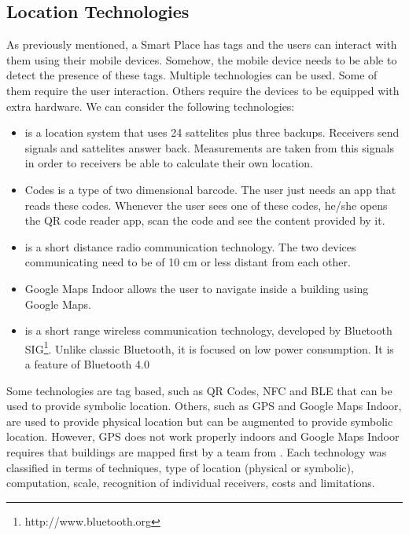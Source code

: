 \subsection{Location Technologies}
\label{sec:background_technologies}
As previously mentioned, a Smart Place has tags and the users can interact with them using their mobile devices.
Somehow, the mobile device needs to be able to detect the presence of these tags.
Multiple technologies can be used.
Some of them require the user interaction.
Others require the devices to be equipped with extra hardware.
We can consider the following technologies:
\begin{itemize}
  \item {}
  is a location system that uses 24 sattelites plus three backups.
  Receivers send signals and sattelites answer back. Measurements are taken from this signals in order to receivers be able to calculate their own location.
  \item {} Codes
  is a type of two dimensional barcode.
  The user just needs an app that reads these codes.
  Whenever the user sees one of these codes, he/she opens the \gls{QR} code reader app, scan the code and see the content provided by it.
  \item {}
  is a short distance radio communication technology.
  The two devices communicating need to be of 10 cm or less distant from each other.
  \item Google Maps Indoor
  allows the user to navigate inside a building using Google Maps.
  \item {}
  is a short range wireless communication technology, developed by Bluetooth \gls{SIG}\footnote{http://www.bluetooth.org}.
  Unlike classic Bluetooth, it is focused on low power consumption.
  It is a feature of Bluetooth 4.0\cite{bluetooth_specification}
\end{itemize}

Some technologies are tag based, such as \gls{QR} Codes, \gls{NFC} and \gls{BLE} that can be used to provide symbolic location.
Others, such as \gls{GPS} and Google Maps Indoor, are used to provide physical location but can be augmented to provide symbolic location.
However, \gls{GPS} does not work properly indoors and Google Maps Indoor requires that buildings are mapped first by a team from .
Each technology was classified in terms of techniques, type of location (physical or symbolic), computation, scale, recognition of individual receivers, costs and limitations.

